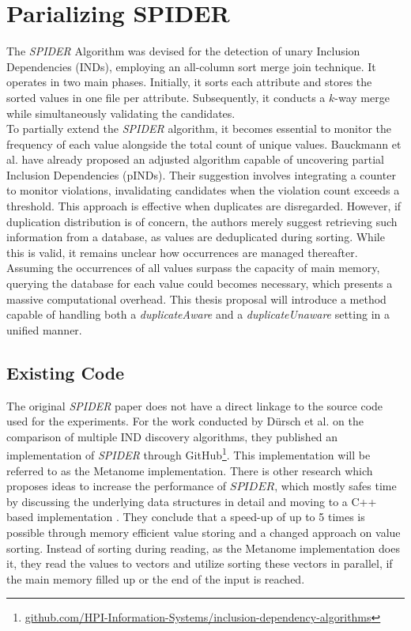 \section{Parializing SPIDER}
The \textit{SPIDER} Algorithm \cite{bauckmann2006efficiently} was devised for the detection of unary Inclusion Dependencies (INDs), employing an all-column sort merge join technique. It operates in two main phases. Initially, it sorts each attribute and stores the sorted values in one file per attribute. Subsequently, it conducts a $k$-way merge while simultaneously validating the candidates. \\

\noindent To partially extend the \textit{SPIDER} algorithm, it becomes essential to monitor the frequency of each value alongside the total count of unique values. Bauckmann et al. have already proposed an adjusted algorithm capable of uncovering partial Inclusion Dependencies (pINDs). Their suggestion involves integrating a counter to monitor violations, invalidating candidates when the violation count exceeds a threshold. This approach is effective when duplicates are disregarded. However, if duplication distribution is of concern, the authors merely suggest retrieving such information from a database, as values are deduplicated during sorting. While this is valid, it remains unclear how occurrences are managed thereafter. Assuming the occurrences of all values surpass the capacity of main memory, querying the database for each value could becomes necessary, which presents a massive computational overhead. This thesis proposal will introduce a method capable of handling both a \textit{duplicateAware} and a \textit{duplicateUnaware} setting in a unified manner.

\subsection{Existing Code}
The original \textit{SPIDER} paper does not have a direct linkage to the source code used for the experiments. For the work conducted by Dürsch et al. on the comparison of multiple IND discovery algorithms\cite{dursch2019inclusion}, they published an implementation of \textit{SPIDER} through GitHub\footnote{\href{https://github.com/HPI-Information-Systems/inclusion-dependency-algorithms}{github.com/HPI-Information-Systems/inclusion-dependency-algorithms}}. This implementation will be referred to as the Metanome implementation. There is other research which proposes ideas to increase the performance of $SPIDER$, which mostly safes time by discussing the underlying data structures in detail and moving to a C++ based implementation \cite{smirnov2023fast}. They conclude that a speed-up of up to 5 times is possible through memory efficient value storing and a changed approach on value sorting. Instead of sorting during reading, as the Metanome implementation does it, they read the values to vectors and utilize sorting these vectors in parallel, if the main memory filled up or the end of the input is reached.

